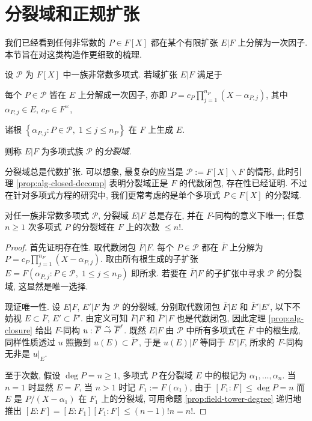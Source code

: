 \section{分裂域和正规扩张}\label{sec:splitting-field}
我们已经看到任何非常数的 $P \in F[X]$ 都在某个有限扩张 $E|F$ 上分解为一次因子. 本节旨在对这类构造作更细致的梳理.

\begin{definition}
	设 $\mathcal{P}$ 为 $F[X]$ 中一族非常数多项式. 若域扩张 $E|F$ 满足于
	\begin{compactitem}
		\item 每个 $P \in \mathcal{P}$ 皆在 $E$ 上分解成一次因子, 亦即 $P = c_P \prod_{j=1}^{n_P}(X - \alpha_{P,j})$, 其中 $\alpha_{P,j} \in E$, $c_P \in F^\times$,
		\item 诸根 $\left\{ \alpha_{P,j} : P \in \mathcal{P},\; 1 \leq j \leq n_P \right\}$ 在 $F$ 上生成 $E$.
	\end{compactitem}
	则称 $E|F$ 为多项式族 $\mathcal{P}$ 的\emph{分裂域}.
\end{definition}
分裂域总是代数扩张. 可以想象, 最复杂的应当是 $\mathcal{P} := F[X] \smallsetminus F$ 的情形, 此时引理 \ref{prop:alg-closed-decomp} 表明分裂域正是 $F$ 的代数闭包, 存在性已经证明. 不过在针对多项式方程的研究中, 我们更常考虑的是单个多项式 $P \in F[X]$ 的分裂域.

\begin{proposition}
	对任一族非常数多项式 $\mathcal{P}$, 分裂域 $E|F$ 总是存在, 并在 $F$-同构的意义下唯一; 任意 $n \geq 1$ 次多项式 $P$ 的分裂域在 $F$ 上的次数 $\leq n!$.
\end{proposition}
\begin{proof}
	首先证明存在性. 取代数闭包 $\overline{F}|F$. 每个 $P \in \mathcal{P}$ 都在 $\overline{F}$ 上分解为 $P = c_P \prod_{j=1}^{n_P}(X - \alpha_{P,j})$. 取由所有根生成的子扩张 $E = F\left( \alpha_{P,j} : P \in \mathcal{P},\; 1 \leq j \leq n_P \right)$ 即所求. 若要在 $\overline{F}|F$ 的子扩张中寻求 $\mathcal{P}$ 的分裂域, 这显然是唯一选择.

	现证唯一性. 设 $E|F$, $E'|F$ 为 $\mathcal{P}$ 的分裂域, 分别取代数闭包 $\overline{F}|E$ 和 $\overline{F}'|E'$, 以下不妨视 $E \subset \overline{F}$, $E' \subset \overline{F}'$. 由定义可知 $\overline{F}|F$ 和 $\overline{F}'|F$ 也是代数闭包, 因此定理 \ref{prop:alg-closure} 给出 $F$-同构 $u: \overline{F} \stackrel{\sim}{\rightarrow} \overline{F}'$. 既然 $E|F$ 由 $\mathcal{P}$ 中所有多项式在 $\overline{F}$ 中的根生成, 同样性质透过 $u$ 照搬到 $u(E) \subset \overline{F}'$, 于是 $u(E)|F$ 等同于 $E'|F$, 所求的 $F$-同构无非是 $u|_E$.

	至于次数, 假设 $\deg P = n \geq 1$, 多项式 $P$ 在分裂域 $E$ 中的根记为 $\alpha_1, \ldots, \alpha_n$. 当 $n=1$ 时显然 $E=F$, 当 $n>1$ 时记 $F_1 := F(\alpha_1)$, 由于 $[F_1:F] \leq \deg P = n$ 而 $E$ 是 $P/(X-\alpha_1)$ 在 $F_1$ 上的分裂域, 可用命题 \ref{prop:field-tower-degree} 递归地推出 $[E:F] = [E:F_1][F_1:F] \leq (n-1)! n = n!$.
\end{proof}

